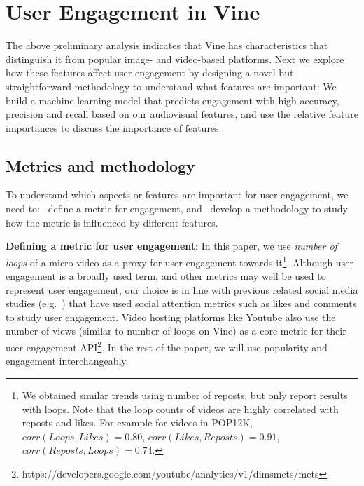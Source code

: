 \section{User Engagement in Vine}
\label{sec:classifier}
The above preliminary analysis indicates that Vine has characteristics that distinguish it from popular image- and video-based platforms. Next we explore how these features affect user engagement by designing a novel but straightforward methodology to understand what features are important: We build a machine learning model that predicts  engagement with high accuracy, precision and recall based on our audiovisual features, and use the relative feature importances to discuss the importance of features. %

\subsection{Metrics and methodology}
\label{sec:methodology}
To understand which aspects or features are important for user engagement, we need to: \one\ define a metric for engagement, and \two\ develop a methodology to study how the metric is influenced by different features. 

\noindent\textbf{Defining a metric for user engagement}:  In this paper, we  use \emph{number of loops} of a micro video as a proxy for user engagement towards it\footnote{We obtained similar trends using number of reposts, but only report results with loops. Note that the loop counts of videos are highly correlated with reposts and likes. For example for videos in POP12K, $ corr(Loops,Likes) = 0.80$, $corr(Likes,Reposts) = 0.91$, $corr(Reposts,Loops) = 0.74$.}.
Although user engagement is a broadly used term, and other metrics may well be used to represent user engagement, our choice is in line with previous related social media studies (e.g.~\cite{bakhshi2014faces})  that have used social attention metrics such as likes and comments to study user engagement. Video hosting platforms like Youtube also use the number of views (similar to number of loops on Vine) as a core metric for their user engagement API\footnote{\scriptsize https://developers.google.com/youtube/analytics/v1/dimsmets/mets}. In the rest of the paper, we will use popularity and engagement interchangeably.

